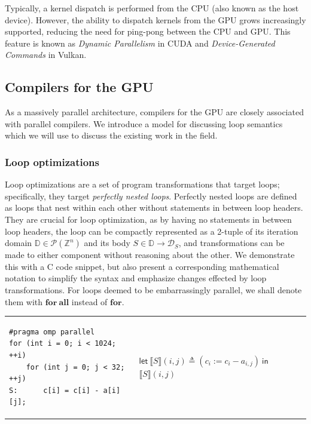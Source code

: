 \documentclass[review, acmsmall, nonacm]{acmart}
\newcommand{\domain}{\mathbb{D}}
\begin{document}
Typically, a kernel dispatch is performed from the CPU (also known as the host device). However, the ability to dispatch kernels from the GPU grows increasingly supported, reducing the need for ping-pong between the CPU and GPU. This feature is known as \emph{Dynamic Parallelism} \cite{adinetCUDADynamicParallelism2014} in CUDA and \emph{Device-Generated Commands} \cite{blumenkrantzVK_EXT_device_generated_commands3VulkanDocumentation2024} in Vulkan.

\subsection{Compilers for the GPU}

As a massively parallel architecture, compilers for the GPU are closely associated with parallel compilers. We introduce a model for discussing loop semantics which we will use to discuss the existing work in the field.

\subsubsection{Loop optimizations} Loop optimizations are a set of program transformations that target loops; specifically, they target \emph{perfectly nested loops}. Perfectly nested loops are defined as loops that nest within each other without statements in between loop headers. They are crucial for loop optimization, as by having no statements in between loop headers, the loop can be compactly represented as a 2-tuple of its iteration domain $\domain \in \mathcal{P}(\mathbb{Z}^{n})$ and its body $S \in \domain \to \mathcal{D}_S$, and transformations can be made to either component without reasoning about the other. We demonstrate this with a C code snippet, but also present a corresponding mathematical notation to simplify the syntax and emphasize changes effected by loop transformations. For loops deemed to be embarrassingly parallel, we shall denote them with $\mathbf{for~all}$ instead of $\mathbf{for}$.

\begin{tabular}{p{}p{}}
\begin{verbatim}
#pragma omp parallel 
for (int i = 0; i < 1024; ++i)
    for (int j = 0; j < 32; ++j)
S:      c[i] = c[i] - a[i][j];
\end{verbatim}
&%

\begin{algorithmic}
  \State $\mathsf{let }~ \lBrack  S \rBrack (i,j) \triangleq \left( c_i := c_i - a_{i,j} \right) ~\mathsf{in}$ 
  \ForAll {$i \in [0,1024)$}  
    \For {$j \in [0, 32)$}  
      \State $ \lBrack  S \rBrack (i,j) $
    \EndFor
  \EndFor
\end{algorithmic}
\vfill
\end{tabular}
\end{document}
